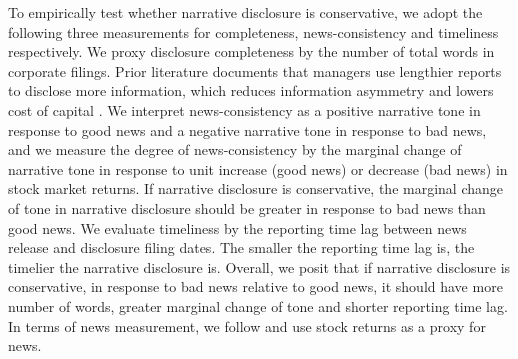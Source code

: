 \documentclass[a4paper]{article}
\begin{document}
\begin{spacing}{2}
To empirically test whether narrative disclosure is conservative, we adopt the following three measurements for completeness, news-consistency and timeliness respectively. We proxy disclosure completeness by the number of total words in corporate filings. Prior literature documents that managers use lengthier reports to disclose more information, which reduces information asymmetry and lowers cost of capital . We interpret news-consistency as a positive narrative tone in response to good news and a negative narrative tone in response to bad news, and we measure the degree of news-consistency by the marginal change of narrative tone in response to unit increase (good news) or decrease (bad news) in stock market returns. If narrative disclosure is conservative, the marginal change of tone in narrative disclosure should be greater in response to bad news than good news. We evaluate timeliness by the reporting time lag between news release and disclosure filing dates. The smaller the reporting time lag is, the timelier the narrative disclosure is. Overall, we posit that if narrative disclosure is conservative, in response to bad news relative to good news, it should have more number of words, greater marginal change of tone and shorter reporting time lag. In terms of news measurement, we follow  and use stock returns as a proxy for news.


\end{spacing}
\end{document}
